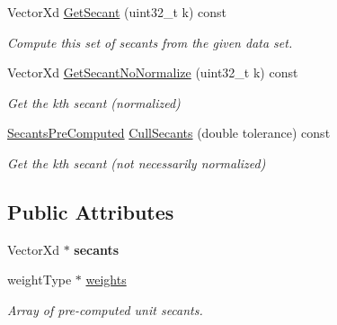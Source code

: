 \begin{DoxyCompactItemize}
\item 
\hypertarget{struct_d_r_d_s_p_1_1_secants_pre_computed_a6b9de4610d5af4f02ab7b0c6fc326ed8}{Vector\-Xd \hyperlink{struct_d_r_d_s_p_1_1_secants_pre_computed_a6b9de4610d5af4f02ab7b0c6fc326ed8}{Get\-Secant} (uint32\-\_\-t k) const }\label{struct_d_r_d_s_p_1_1_secants_pre_computed_a6b9de4610d5af4f02ab7b0c6fc326ed8}

\begin{DoxyCompactList}\small\item\em Compute this set of secants from the given data set. \end{DoxyCompactList}\item 
\hypertarget{struct_d_r_d_s_p_1_1_secants_pre_computed_aedd413333624ec2b3da2a70262b65481}{Vector\-Xd \hyperlink{struct_d_r_d_s_p_1_1_secants_pre_computed_aedd413333624ec2b3da2a70262b65481}{Get\-Secant\-No\-Normalize} (uint32\-\_\-t k) const }\label{struct_d_r_d_s_p_1_1_secants_pre_computed_aedd413333624ec2b3da2a70262b65481}

\begin{DoxyCompactList}\small\item\em Get the kth secant (normalized) \end{DoxyCompactList}\item 
\hypertarget{struct_d_r_d_s_p_1_1_secants_pre_computed_a8dcdb9edcefeee50e17d6ab3b792f5e6}{\hyperlink{struct_d_r_d_s_p_1_1_secants_pre_computed}{Secants\-Pre\-Computed} \hyperlink{struct_d_r_d_s_p_1_1_secants_pre_computed_a8dcdb9edcefeee50e17d6ab3b792f5e6}{Cull\-Secants} (double tolerance) const }\label{struct_d_r_d_s_p_1_1_secants_pre_computed_a8dcdb9edcefeee50e17d6ab3b792f5e6}

\begin{DoxyCompactList}\small\item\em Get the kth secant (not necessarily normalized) \end{DoxyCompactList}\end{DoxyCompactItemize}
\subsection*{Public Attributes}
\begin{DoxyCompactItemize}
\item 
\hypertarget{struct_d_r_d_s_p_1_1_secants_pre_computed_a15231ffddb89ae1eb2c83cbdc463905a}{Vector\-Xd $\ast$ {\bfseries secants}}\label{struct_d_r_d_s_p_1_1_secants_pre_computed_a15231ffddb89ae1eb2c83cbdc463905a}

\item 
\hypertarget{struct_d_r_d_s_p_1_1_secants_pre_computed_a4bb39354f325540fefe37eb7c3f59ad1}{weight\-Type $\ast$ \hyperlink{struct_d_r_d_s_p_1_1_secants_pre_computed_a4bb39354f325540fefe37eb7c3f59ad1}{weights}}\label{struct_d_r_d_s_p_1_1_secants_pre_computed_a4bb39354f325540fefe37eb7c3f59ad1}

\begin{DoxyCompactList}\small\item\em Array of pre-\/computed unit secants. \end{DoxyCompactList}\end{DoxyCompactItemize}


